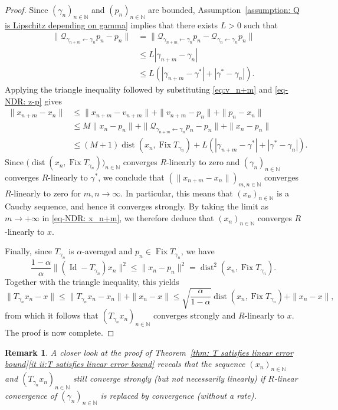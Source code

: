 \documentclass[a4paper,12pt]{article}
\newtheorem{remark}[theorem]{Remark}
\DeclareMathOperator{\Id}{Id}
\DeclareMathOperator{\Fix}{Fix}
\DeclareMathOperator{\dist}{dist}
\begin{document}
\begin{proof}
    Since $(\gamma_n)_{n \in \mathbb{N}}$ and $(p_n)_{n \in \mathbb{N}}$ are bounded, Assumption~\ref{assumption: Q is Lipschitz depending on gamma} implies that there exists $L> 0$ such that
    \begin{equation}\label{eq-NDR: z-p}
        \begin{aligned}
            \|\mathcal{Q}_{\gamma_{n+m}\leftarrow\gamma_n}p_n-p_n\|&=\|\mathcal{Q}_{\gamma_{n+m}\leftarrow\gamma_n}p_n-\mathcal{Q}_{\gamma_n\leftarrow\gamma_n}p_n\|\\
            &\leq L|\gamma_{n+m}-\gamma_n|\\
            &\leq L(|\gamma_{n+m}-\gamma^*|+|\gamma^*-\gamma_n|).
        \end{aligned}
    \end{equation}
    Applying the triangle inequality followed by substituting \eqref{eq:v_n+m} and \eqref{eq-NDR: z-p} gives
        \begin{equation}\label{eq-NDR: x_n+m}
        \begin{aligned}
            \|x_{n+m}-x_n\|
            &\leq\|x_{n+m}-v_{n+m}\|+\|v_{n+m}-p_n\|+\|p_n-x_n\|\\
            &\leq M\|x_n-p_n\|+\|\mathcal{Q}_{\gamma_{n+m}\leftarrow\gamma_n}p_n-p_n\|+\|x_n-p_n\|\\
            &\leq (M+1)\dist(x_n,\Fix T_{\gamma_n})+L(|\gamma_{n+m}-\gamma^*|+|\gamma^*-\gamma_n|).
        \end{aligned}
    \end{equation}
    Since $\big(\dist(x_n,\Fix T_{\gamma_n})\big)_{n \in \mathbb{N}}$ converges $R$-linearly to zero and $(\gamma_n)_{n\in\mathbb{N}}$ converges $R$-linearly to $\gamma^*$, we conclude that $(\|x_{n+m}-x_n\|)_{m,n \in \mathbb{N}}$ converges $R$-linearly to zero for $m,n\rightarrow \infty$. In particular, this means that $(x_n)_{n\in\mathbb{N}}$ is a Cauchy sequence, and hence it converges strongly. By taking the limit as $m\to+\infty$ in \eqref{eq-NDR: x_n+m}, we therefore deduce that $(x_n)_{n\in\mathbb{N}}$ converges $R$-linearly to $x$.
    
    Finally, since $T_{\gamma_n}$ is $\alpha$-averaged and $p_n\in\Fix T_{\gamma_n} $, we have 
    $$\frac{1-\alpha}{\alpha}\|(\Id-T_{\gamma_n})x_n\|^2\leq \|x_n-p_n\|^2=\dist^2(x_n,\Fix T_{\gamma_n}).$$
    Together with the triangle inequality, this yields
     $$\|T_{\gamma_n}x_n-x\|\leq \|T_{\gamma_n}x_n-x_n\| + \|x_n-x\| \leq \sqrt{\frac{\alpha}{1-\alpha}}\dist(x_n,\Fix T_{\gamma_n}) + \|x_n-x\| , $$
     from which it follows that $(T_{\gamma_n}x_n)_{n\in\mathbb{N}}$ converges strongly and  $R$-linearly to $x$.
    The proof is now complete.
\end{proof}
\begin{remark} A closer look at the proof of Theorem~\ref{thm: T satisfies linear error bound}\eqref{it ii:T satisfies linear error bound} reveals that the sequence $(x_n)_{n\in\mathbb{N}}$ and $(T_{\gamma_n}x_n)_{n\in\mathbb{N}}$ still converge strongly (but not necessarily linearly) if $R$-linear convergence of $(\gamma_n)_{n\in\mathbb{N}}$ is replaced by convergence (without a rate).
\end{remark}
\end{document}
